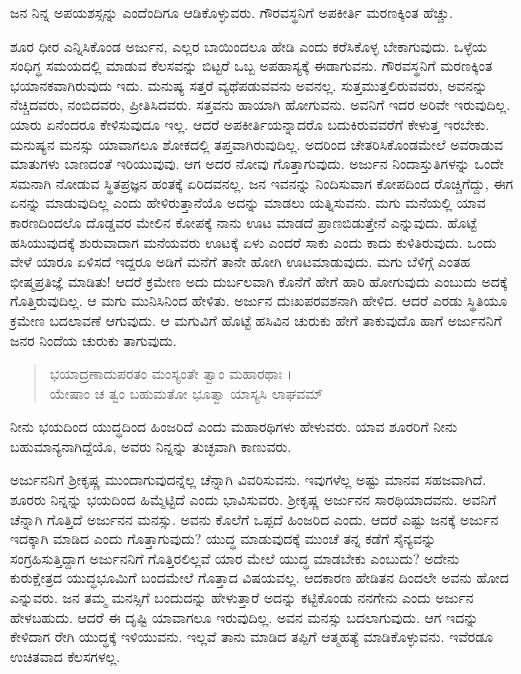 {\small ಜನ ನಿನ್ನ ಅಪಯಶಸ್ಸನ್ನು ಎಂದೆಂದಿಗೂ ಆಡಿಕೊಳ್ಳುವರು. ಗೌರವಸ್ಥನಿಗೆ ಅಪಕೀರ್ತಿ ಮರಣಕ್ಕಿಂತ ಹೆಚ್ಚು.}

ಶೂರ ಧೀರ ಎನ್ನಿಸಿಕೊಂಡ ಅರ್ಜುನ, ಎಲ್ಲರ ಬಾಯಿಂದಲೂ ಹೇಡಿ ಎಂದು ಕರೆಸಿಕೊಳ್ಳ ಬೇಕಾಗುವುದು. ಒಳ್ಳೆಯ ಸಂಧಿಗ್ಧ ಸಮಯದಲ್ಲಿ ಮಾಡುವ ಕೆಲಸವನ್ನು ಬಿಟ್ಟರೆ ಒಬ್ಬ ಅಪಹಾಸ್ಯಕ್ಕೆ ಈಡಾಗುವನು. ಗೌರವಸ್ಥನಿಗೆ ಮರಣಕ್ಕಿಂತ ಭಯಾನಕವಾಗಿರುವುದು ಇದು. ಮನುಷ್ಯ ಸತ್ತರೆ ವ್ಯಥೆಪಡುವವನು ಅವನಲ್ಲ. ಸುತ್ತಮುತ್ತಲಿರುವವರು, ಅವನನ್ನು ನೆಚ್ಚಿದವರು, ನಂಬಿದವರು, ಪ್ರೀತಿಸಿದವರು. ಸತ್ತವನು ಹಾಯಾಗಿ ಹೋಗುವನು. ಅವನಿಗೆ ಇದರ ಅರಿವೇ ಇರುವುದಿಲ್ಲ. ಯಾರು ಏನೆಂದರೂ ಕೇಳಿಸುವುದೂ ಇಲ್ಲ. ಆದರೆ ಅಪಕೀರ್ತಿಯನ್ನಾದರೊ ಬದುಕಿರುವವರೆಗೆ ಕೇಳುತ್ತ ಇರಬೇಕು. ಮನುಷ್ಯನ ಮನಸ್ಸು ಯಾವಾಗಲೂ ಶೋಕದಲ್ಲಿ ತಪ್ತವಾಗಿರುವುದಿಲ್ಲ. ಅದರಿಂದ ಚೇತರಿಸಿಕೊಂಡಮೇಲೆ ಅವರಾಡುವ ಮಾತುಗಳು ಬಾಣದಂತೆ ಇರಿಯುವುವು. ಆಗ ಅದರ ನೋವು ಗೊತ್ತಾಗುವುದು. ಅರ್ಜುನ ನಿಂದಾಸ್ತುತಿಗಳನ್ನು ಒಂದೇ ಸಮನಾಗಿ ನೋಡುವ ಸ್ಥಿತಪ್ರಜ್ಞನ ಹಂತಕ್ಕೆ ಏರಿದವನಲ್ಲ. ಜನ ಇವನನ್ನು ನಿಂದಿಸುವಾಗ ಕೋಪದಿಂದ ರೊಚ್ಚಿಗೆದ್ದು, ಈಗ ಏನನ್ನು ಮಾಡುವುದಿಲ್ಲ ಎಂದು ಹೇಳಿರುತ್ತಾನೆಯೊ ಅದನ್ನು ಮಾಡಲು ಯತ್ನಿಸುವನು. ಮಗು ಮನೆಯಲ್ಲಿ ಯಾವ ಕಾರಣದಿಂದಲೊ ದೊಡ್ಡವರ ಮೇಲಿನ ಕೋಪಕ್ಕೆ ನಾನು ಊಟ ಮಾಡದೆ ಪ್ರಾಣಬಿಡುತ್ತೇನೆ ಎನ್ನುವುದು. ಹೊಟ್ಟೆ ಹಸಿಯುವುದಕ್ಕೆ ಶುರುವಾದಾಗ ಮನೆಯವರು ಊಟಕ್ಕೆ ಏಳು ಎಂದರೆ ಸಾಕು ಎಂದು ಕಾದು ಕುಳಿತಿರುವುದು. ಒಂದು ವೇಳೆ ಯಾರೂ ಏಳಿಸದೆ ಇದ್ದರೂ ಅಡಿಗೆ ಮನೆಗೆ ತಾನೇ ಹೋಗಿ ಊಟಮಾಡುವುದು. ಮಗು ಬೆಳಿಗ್ಗೆ ಎಂತಹ ಭೀಷ್ಮಪ್ರತಿಜ್ಞೆ ಮಾಡಿತು! ಆದರೆ ಕ್ರಮೇಣ ಅದು ದುರ್ಬಲವಾಗಿ ಕೊನೆಗೆ ಹೇಗೆ ಹಾರಿ ಹೋಗುವುದು ಎಂಬುದು ಅದಕ್ಕೆ ಗೊತ್ತಿರುವುದಿಲ್ಲ. ಆ ಮಗು ಮುನಿಸಿನಿಂದ ಹೇಳಿತು. ಅರ್ಜುನ ದುಃಖಪರವಶನಾಗಿ ಹೇಳಿದ. ಆದರೆ ಎರಡು ಸ್ಥಿತಿಯೂ ಕ್ರಮೇಣ ಬದಲಾವಣೆ ಆಗುವುದು. ಆ ಮಗುವಿಗೆ ಹೊಟ್ಟೆ ಹಸಿವಿನ ಚುರುಕು ಹೇಗೆ ತಾಕುವುದೊ ಹಾಗೆ ಅರ್ಜುನನಿಗೆ ಜನರ ನಿಂದೆಯ ಚುರುಕು ತಾಗುವುದು.

\begin{verse}
ಭಯಾದ್ರಣಾದುಪರತಂ ಮಂಸ್ಯಂತೇ ತ್ವಾಂ ಮಹಾರಥಾಃ ।\\ಯೇಷಾಂ ಚ ತ್ವಂ ಬಹುಮತೋ ಭೂತ್ವಾ ಯಾಸ್ಯಸಿ ಲಾಘವಮ್ 
\end{verse}

{\small ನೀನು ಭಯದಿಂದ ಯುದ್ಧದಿಂದ ಹಿಂಜರಿದೆ ಎಂದು ಮಹಾರಥಿಗಳು ಹೇಳುವರು. ಯಾವ ಶೂರರಿಗೆ ನೀನು ಬಹುಮಾನ್ಯನಾಗಿದ್ದೆಯೊ, ಅವರು ನಿನ್ನನ್ನು ತುಚ್ಛವಾಗಿ ಕಾಣುವರು.}

ಅರ್ಜುನನಿಗೆ ಶ್ರೀಕೃಷ್ಣ ಮುಂದಾಗುವುದನ್ನೆಲ್ಲ ಚೆನ್ನಾಗಿ ವಿವರಿಸುವನು. ಇವುಗಳೆಲ್ಲ ಅಷ್ಟು ಮಾನವ ಸಹಜವಾಗಿದೆ. ಶೂರರು ನಿನ್ನನ್ನು ಭಯದಿಂದ ಹಿಮ್ಮೆಟ್ಟಿದೆ ಎಂದು ಭಾವಿಸುವರು. ಶ್ರೀಕೃಷ್ಣ ಅರ್ಜುನನ ಸಾರಥಿಯಾದವನು. ಅವನಿಗೆ ಚೆನ್ನಾಗಿ ಗೊತ್ತಿದೆ ಅರ್ಜುನನ ಮನಸ್ಸು. ಅವನು ಕೊಲೆಗೆ ಒಪ್ಪದೆ ಹಿಂಜರಿದ ಎಂದು. ಆದರೆ ಎಷ್ಟು ಜನಕ್ಕೆ ಅರ್ಜುನ ಇದಕ್ಕಾಗಿ ಮಾಡಿದ ಎಂದು ಗೊತ್ತಾಗುವುದು? ಯುದ್ಧ ಮಾಡುವುದಕ್ಕೆ ಮುಂಚೆ ತನ್ನ ಕಡೆಗೆ ಸೈನ್ಯವನ್ನು ಸಂಗ್ರಹಿಸುತ್ತಿದ್ದಾಗ ಅರ್ಜುನನಿಗೆ ಗೊತ್ತಿರಲಿಲ್ಲವೆ ಯಾರ ಮೇಲೆ ಯುದ್ಧ ಮಾಡಬೇಕು ಎಂಬುದು? ಅದೇನು ಕುರುಕ್ಷೇತ್ರದ ಯುದ್ಧಭೂಮಿಗೆ ಬಂದಮೇಲೆ ಗೊತ್ತಾದ ವಿಷಯವಲ್ಲ. ಆದಕಾರಣ ಹೇಡಿತನ ದಿಂದಲೇ ಅವನು ಹೋದ ಎನ್ನುವರು. ಜನ ತಮ್ಮ ಮನಸ್ಸಿಗೆ ಬಂದುದನ್ನು ಹೇಳುತ್ತಾರೆ ಅದನ್ನು ಕಟ್ಟಿಕೊಂಡು ನನಗೇನು ಎಂದು ಅರ್ಜುನ ಹೇಳಬಹುದು. ಆದರೆ ಈ ದೃಷ್ಟಿ ಯಾವಾಗಲೂ ಇರುವುದಿಲ್ಲ. ಅವನ ಮನಸ್ಸು ಬದಲಾಗುವುದು. ಆಗ ಇದನ್ನು ಕೇಳಿದಾಗ ರೇಗಿ ಯುದ್ಧಕ್ಕೆ ಇಳಿಯುವನು. ಇಲ್ಲವೆ ತಾನು ಮಾಡಿದ ತಪ್ಪಿಗೆ ಆತ್ಮಹತ್ಯೆ ಮಾಡಿಕೊಳ್ಳುವನು. ಇವೆರಡೂ ಉಚಿತವಾದ ಕೆಲಸಗಳಲ್ಲ. 

